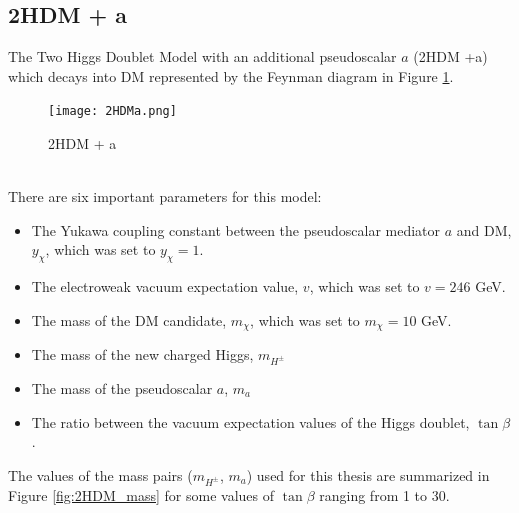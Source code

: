 \documentclass[12pt, a4paper]{book}
\begin{document}
\subsection{2HDM + a}
The Two Higgs Doublet Model with an additional pseudoscalar $a$ (2HDM +a) which decays into DM represented by the Feynman diagram in Figure \ref{fig:2HDM}.
\begin{figure}[!ht]
    \centering
    \texttt{[image: 2HDMa.png]}
    \caption{2HDM + a}\label{fig:2HDM}
\end{figure}
\\There are six important parameters for this model:
\begin{itemize}
    \item The Yukawa coupling constant between the pseudoscalar mediator $a$ and DM, $y_\chi$, which was set to $y_\chi=1$. 
    \item The electroweak vacuum expectation value, $v$, which was set to $v=246$ GeV. 
    \item The mass of the DM candidate, $m_\chi$, which was set to $m_\chi=10$ GeV. 
    \item The mass of the new charged Higgs, $m_{H^\pm}$ 
    \item The mass of the pseudoscalar $a$, $m_a$ 
    \item The ratio between the vacuum expectation values of the Higgs doublet, $\tan\beta$. 
\end{itemize} 
The values of the mass pairs ($m_{H^\pm}$, $m_a$) used for this thesis are summarized in Figure \ref{fig:2HDM_mass} for some values of $\tan\beta$ ranging from 1 to 30.
\graphicspath{{../../../Plots/2d_masses/}}
\end{document}
